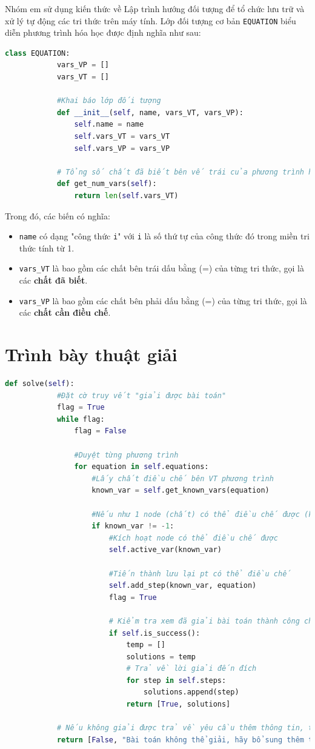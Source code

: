 \documentclass[a4paper]{article}
\begin{document}
	Nhóm em sử dụng kiến thức về Lập trình hướng đối tượng để tổ chức lưu trữ và xử lý tự động các tri thức trên máy tính. Lớp đối tượng cơ bản \texttt{EQUATION} biểu diễn phương trình hóa học được định nghĩa như sau:
	\begin{lstlisting}[language=Python, caption=Lớp đối tượng \texttt{EQUATION}]
		class EQUATION:
			vars_VP = []
			vars_VT = []
			
			#Khai báo lớp đối tượng
			def __init__(self, name, vars_VT, vars_VP):
				self.name = name
				self.vars_VT = vars_VT
				self.vars_VP = vars_VP
			
			# Tổng số chất đã biết bên vế trái của phương trình hóa học
			def get_num_vars(self):
				return len(self.vars_VT)
	\end{lstlisting}
	Trong đó, các biến có nghĩa:
	\begin{itemize}
		\item \texttt{name} có dạng "công thức \texttt{i}" với \texttt{i} là số thứ tự của công thức đó trong miền tri thức tính từ 1.
		\item \texttt{vars\_VT} là bao gồm các chất bên trái dấu bằng (=) của từng tri thức, gọi là các \textbf{chất đã biết}.
		\item \texttt{vars\_VP} là bao gồm các chất bên phải dấu bằng (=) của từng tri thức, gọi là các \textbf{chất cần điều chế}.
	\end{itemize}
	
	\section{Trình bày thuật giải}
	\begin{lstlisting}[language=Python, caption=Thuật giải mạng ngữ nghĩa điều chế]
		def solve(self):
			#Đặt cờ truy vết "giải được bài toán"
			flag = True
			while flag:
				flag = False
					
				#Duyệt từng phương trình
				for equation in self.equations:
					#Lấy chất điều chế bên VT phương trình
					known_var = self.get_known_vars(equation)
					
					#Nếu như 1 node (chất) có thể điều chế được (khác -1)
					if known_var != -1:
						#Kích hoạt node có thể điều chế được
						self.active_var(known_var)
						
						#Tiến thành lưu lại pt có thể điều chế
						self.add_step(known_var, equation)
						flag = True
						
						# Kiểm tra xem đã giải bài toán thành công chưa?
						if self.is_success():
							temp = []
							solutions = temp
							# Trả về lời giải đến đích
							for step in self.steps:
								solutions.append(step)
							return [True, solutions]
						
			# Nếu không giải được trả về yêu cầu thêm thông tin, tri thức
			return [False, "Bài toán không thể giải, hãy bổ sung thêm thông tin hoặc tri thức."]
	\end{lstlisting}
	
\end{document}
